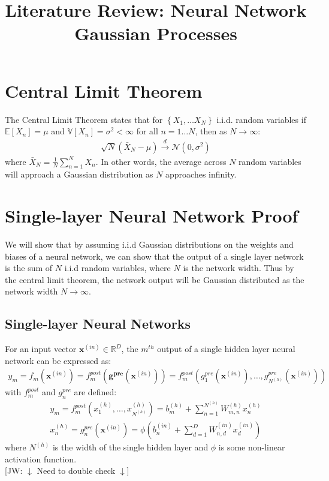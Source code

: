 \documentclass[twoside,11pt]{article}
\newcommand{\jw}[1]{{\color{gray} [JW: #1]}}
\begin{document}
\title{Literature Review: Neural Network Gaussian Processes}
\maketitle
\section{Central Limit Theorem}
The Central Limit Theorem states that for $\left\{ X_1, \dots X_N \right\}$ i.i.d. random variables if $\mathbb{E}\left[X_n\right] = \mu$ and $\mathbb{V}\left[X_n\right] = \sigma^2 < \infty$ for all $n=1\dots N$, then as $N \rightarrow \infty$:
\begin{align}
    \sqrt{N}\left(\bar{X}_N-\mu\right) \xrightarrow{d} \mathcal{N}\left(0, \sigma^2\right)
\end{align}
where $\bar{X}_N = \frac{1}{N}\sum_{n=1}^N X_n$. In other words, the average across $N$ random variables will approach a Gaussian distribution as $N$ approaches infinity.
\section{Single-layer Neural Network Proof \cite{lee2018deep}}
We will show that by assuming i.i.d Gaussian distributions on the weights and biases of a neural network, we can show that the output of a single layer network is the sum of $N$ i.i.d random variables, where $N$ is the network width. Thus by the central limit theorem, the network output will be Gaussian distributed as the network width $N \rightarrow \infty$.
\subsection{Single-layer Neural Networks}
For an input vector $\mathbf{x}^{(in)} \in \mathbb{R}^D$, the $m^{th}$ output of a single hidden layer neural network can be expressed as:
\begin{align}
    \label{single-layer}
    y_m = f_m\left(\textbf{x}^{(in)}\right) = f_m^{post}\left(\mathbf{g^{pre}}\left(\textbf{x}^{(in)}\right)\right) = f_m^{post}\left(g_1^{pre}\left(\textbf{x}^{(in)}\right), \dots, g_{N^{(h)}}^{pre}\left(\textbf{x}^{(in)}\right)\right)
\end{align}
with $f_m^{post}$ and $g_{n}^{pre}$ are defined:
\begin{align}
    \label{single-layer-out}
    y_m = f_m^{post}\left(x_{1}^{(h)}, \dots, x_{N^{(h)}}^{(h)}\right) = b_m^{(h)} + \sum_{n = 1}^{N^{(h)}} W_{m, n}^{(h)} x_{n}^{(h)} \\
    \label{single-layer-hidden}
    x_{n}^{(h)} = g_{n}^{pre}\left(\mathbf{x}^{(in)}\right) = \phi \left(b_n^{(in)} + \sum_{d=1}^{D} W_{n, d}^{(in)}x_{d}^{(in)}\right)
\end{align}
where $N^{(h)}$ is the width of the single hidden layer and $\phi$ is some non-linear activation function. 
\\\jw{$\downarrow$ Need to double check $\downarrow$}
\end{document}

